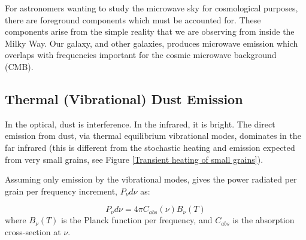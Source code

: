 For astronomers wanting to study the microwave sky for cosmological purposes, there are foreground components which must be accounted for. These components arise from the simple reality that we are observing from inside the Milky Way. Our galaxy, and other galaxies, produces microwave emission which overlaps with frequencies important for the cosmic microwave background (CMB).

\subsection{Thermal (Vibrational) Dust Emission}

In the optical, dust is interference. In the infrared, it is bright. The direct emission from dust, via thermal equilibrium vibrational modes, dominates in the far infrared (this is different from the stochastic heating and emission expected from very small grains, see Figure \ref{Transient heating of small grains}).

Assuming only emission by the vibrational modes, \cite{draine99} gives the power radiated per grain per frequency increment, $P_{\nu}d\nu$ as:

\begin{equation}
\label{spinpower}
P_\nu d\nu = 4\pi C_{abs}(\nu) B_\nu(T)
\end{equation}
where $B_{\nu}(T)$ is the Planck function per frequency, and $C_{abs}$ is the absorption cross-section at $\nu$.

